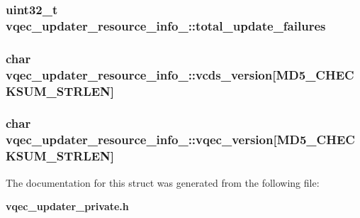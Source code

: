 \subsubsection{\setlength{\rightskip}{0pt plus 5cm}uint32\_\-t \bf{vqec\_\-updater\_\-resource\_\-info\_\-::total\_\-update\_\-failures}}\label{structvqec__updater__resource__info___0e15ec79f48c289b8acc5370b764920d}


\subsubsection{\setlength{\rightskip}{0pt plus 5cm}char \bf{vqec\_\-updater\_\-resource\_\-info\_\-::vcds\_\-version}[MD5\_\-CHECKSUM\_\-STRLEN]}\label{structvqec__updater__resource__info___e73366254f0f8248c28af0f10b13f28b}


\subsubsection{\setlength{\rightskip}{0pt plus 5cm}char \bf{vqec\_\-updater\_\-resource\_\-info\_\-::vqec\_\-version}[MD5\_\-CHECKSUM\_\-STRLEN]}\label{structvqec__updater__resource__info___b136a3e6fb23ded80bf834a29e46eb03}




The documentation for this struct was generated from the following file:\begin{CompactItemize}
\item 
\bf{vqec\_\-updater\_\-private.h}\end{CompactItemize}
